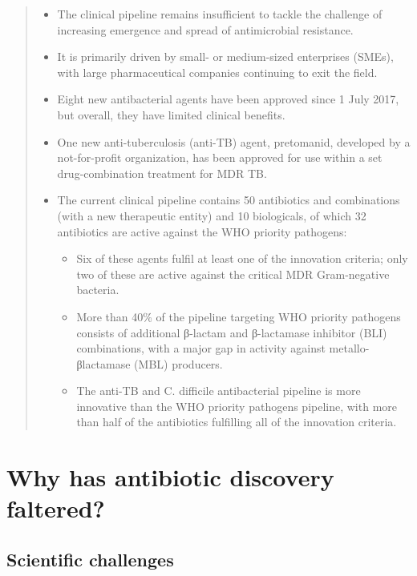 \documentclass[
]{book}
\begin{document}
\begin{quote}
\begin{itemize}
\item
  The clinical pipeline remains insufficient to tackle the challenge of increasing emergence and spread of antimicrobial resistance.
\item
  It is primarily driven by small- or medium-sized enterprises (SMEs), with large pharmaceutical companies continuing to exit the field.
\item
  Eight new antibacterial agents have been approved since 1 July 2017, but overall, they have limited clinical benefits.
\item
  One new anti-tuberculosis (anti-TB) agent, pretomanid, developed by a not-for-profit organization, has been approved for use within a set drug-combination treatment for MDR TB.
\item
  The current clinical pipeline contains 50 antibiotics and combinations (with a new therapeutic entity) and 10 biologicals, of which 32 antibiotics are active against the WHO priority pathogens:

  \begin{itemize}
  \item
    Six of these agents fulfil at least one of the innovation criteria; only two of these are active against the critical MDR Gram-negative bacteria.
  \item
    More than 40\% of the pipeline targeting WHO priority pathogens consists of additional β-lactam and β-lactamase inhibitor (BLI) combinations, with a major gap in activity against metallo-βlactamase (MBL) producers.
  \item
    The anti-TB and C. difficile antibacterial pipeline is more innovative than the WHO priority pathogens pipeline, with more than half of the antibiotics fulfilling all of the innovation criteria.
  \end{itemize}
\end{itemize}
\end{quote}

\hypertarget{why-has-antibiotic-discovery-faltered}{%
\section*{Why has antibiotic discovery faltered?}\label{why-has-antibiotic-discovery-faltered}}

\hypertarget{scientific-challenges}{%
\subsection*{Scientific challenges}\label{scientific-challenges}}
\end{document}
